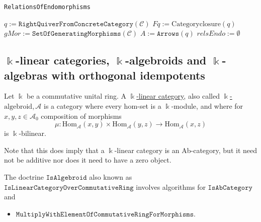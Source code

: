 \begin{algorithm}[H]\capstart
    \caption{\texttt{RelationsOfEndomorphisms}}\label{algo:RelationsOfEndomorphisms}
	\BlankLine
	$q := \mathtt{RightQuiverFromConcreteCategory}(\mathcal{C})$\;
	$Fq :=\mathrm{Category closure}(q)$\;
	$gMor := \mathtt{SetOfGeneratingMorphisms}(\mathcal{C})$\;
	$A := \mathtt{Arrows}(q)$\;
	$relsEndo := \emptyset$\;
	\;
\end{algorithm}

\newpage
\subsection{$\Bbbk$-linear categories, $\Bbbk$-algebroids and $\Bbbk$-algebras with orthogonal idempotents}

\begin{definition}
Let $\Bbbk$ be a commutative unital ring. A \ul{$\Bbbk$-linear category}, also called \ul{$\Bbbk$-$\mathrm{algebroid}$},$\,\mathcal{A}$ is a
category where every hom-set is a $\Bbbk$-module, and where for $x,y,z \in \mathcal{A}_{0}$ composition of morphisms
\[
\mu : \mathrm{Hom}_{\mathcal{A}}(x,y) \times \mathrm{Hom}_{\mathcal{A}}(y,z) \rightarrow \mathrm{Hom}_{\mathcal{A}}(x,z)
\]
is $\Bbbk$-bilinear.

Note that this does imply that a $\Bbbk$-linear category is an Ab-category, but it need not be additive nor does it need to have a zero object.
\end{definition}

\begin{doctrine}
The doctrine $\mathtt{IsAlgebroid}$ also known as\\
$\mathtt{IsLinearCategoryOverCommutativeRing}$ involves algorithms for $\mathtt{IsAbCategory}$ and
\begin{itemize}
\item $\mathtt{MultiplyWithElementOfCommutativeRingForMorphisms}$.
\end{itemize}
\end{doctrine}

